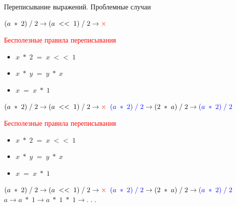 \documentclass[aspectratio=169
  , xcolor={svgnames}
  , russian  %
  ]{beamer}
\begin{document}
\begin{frame}{Переписывание выражений. Проблемные случаи}

{
    \LARGE{ \centering
    $(a \; *\; 2)\; / \;2 \rightarrow (a \;<<\; 1) \;/ \;2 \rightarrow \textcolor{red}{\Huge \times}$
    } \newline \newline

    \vspace{1cm} %

    {\fontsize{15.1}{12}\selectfont \textcolor{red}{Бесполезные правила переписывания}}
    {\fontsize{16.1}{12}\selectfont %
    \begin{itemize}
        \item $x\; * \;2 \; = \;  x \; << \; 1$
        \item $x \;*\; y \;= \;y \;* \;x$
        \item $x \;= \;x \;* \;1$
    \end{itemize}
    }
}

{
    \LARGE{ \centering
    $(a \; *\; 2)\; / \;2 \rightarrow (a \;<<\; 1) \;/ \;2 \rightarrow \textcolor{red}{\Huge \times}$
    } \newline \newline
    \LARGE{ \centering
    $\textcolor{blue}{(a \;*\; 2) \;/\; 2} \rightarrow (2 \;*\; a) \;/\; 2 \rightarrow \textcolor{blue}{(a \;*\; 2) \;/\; 2}$
    }

    \vspace{1cm} %

    {\fontsize{15.1}{12}\selectfont \textcolor{red}{Бесполезные правила переписывания}}
    {\fontsize{16.1}{12}\selectfont %
    \begin{itemize}
        \item $x\; * \;2 \; = \;  x \; << \; 1$
        \item $x \;*\; y \;= \;y \;* \;x$
        \item $x \;= \;x \;* \;1$
    \end{itemize}
    }
}

{
    \LARGE{ \centering
    $(a \; *\; 2)\; / \;2 \rightarrow (a \;<<\; 1) \;/ \;2 \rightarrow \textcolor{red}{\Huge \times}$
    } \newline \newline
    \LARGE{ \centering
    $\textcolor{blue}{(a \;*\; 2) \;/\; 2} \rightarrow (2 \;*\; a) \;/\; 2 \rightarrow \textcolor{blue}{(a \;*\; 2) \;/\; 2}$
    } \newline \newline
    \LARGE{ \centering
    $a \rightarrow a \; * \; 1 \rightarrow a \; * \; 1 \;*\; 1 \rightarrow .\;.\;.$
    }

}
\end{frame}
\end{document}
